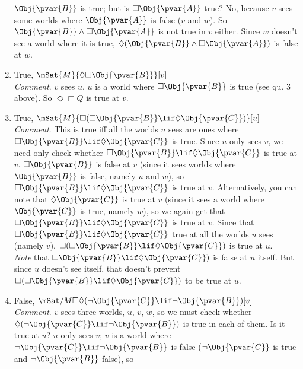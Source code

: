 \documentclass[../../../include/open-logic-section]{subfiles}
\begin{document}
\begin{prob}
\begin{ans}
\begin{enumerate}
        $\Obj{\pvar{B}}$ is true; but is $\Box \Obj{\pvar{A}}$ true? No, because $v$ sees some
        worlds where $\Obj{\pvar{A}}$ is false ($v$ and $w$). So $\Obj{\pvar{B}}\land\Box \Obj{\pvar{A}}$
        is not true in $v$ either. Since $w$ doesn't see a world
        where it is true, $\Diamond(\Obj{\pvar{B}}\land\Box \Obj{\pvar{A}})$ is false
        at $w$.
        \item True, $\mSat{M}{\Diamond\Box \Obj{\pvar{B}}}[v]$\\
        \emph{Comment}. $v$ sees $u$. $u$ is a world where
        $\Box \Obj{\pvar{B}}$ is true (see qu. 3 above). So $\Diamond\Box Q$ is true
        at $v$.
        \item True, $\mSat{M}{\Box(\Box \Obj{\pvar{B}}\lif\Diamond \Obj{\pvar{C}})}[u]$\\
        \emph{Comment}. This is true iff all the worlds $u$ sees are
        ones where $\Box \Obj{\pvar{B}}\lif\Diamond \Obj{\pvar{C}}$ is true. Since $u$
        only sees $v$, we need only check whether $\Box \Obj{\pvar{B}}\lif\Diamond \Obj{\pvar{C}}$
        is true at $v$. $\Box \Obj{\pvar{B}}$ is false at $v$ (since it sees
        worlds where $\Obj{\pvar{B}}$ is false, namely $u$ and $w$), so $\Box \Obj{\pvar{B}}\lif\Diamond \Obj{\pvar{C}}$
        is true at $v$. Alternatively, you can note that $\Diamond \Obj{\pvar{C}}$ is true at $v$
        (since it sees a world where $\Obj{\pvar{C}}$ is true, namely $w$), so 
        we again get that  $\Box \Obj{\pvar{B}}\lif\Diamond \Obj{\pvar{C}}$
        is true at $v$. Since that $\Box \Obj{\pvar{B}}\lif\Diamond \Obj{\pvar{C}}$ true at all
        the worlds $u$ sees (namely $v$), $\Box(\Box \Obj{\pvar{B}}\lif\Diamond \Obj{\pvar{C}})$
        is true at $u$. \\
        \emph{Note} that $\Box \Obj{\pvar{B}}\lif\Diamond \Obj{\pvar{C}})$ is false at $u$ itself.
        But since $u$ doesn't see itself, that doesn't prevent $\Box(\Box \Obj{\pvar{B}}\lif\Diamond \Obj{\pvar{C}})$
        to be true at $u$.
        \item False, $\mSat/{M}{\Box\Diamond(\lnot \Obj{\pvar{C}}\lif\lnot \Obj{\pvar{B}})}[v]$\\
        \emph{Comment}. $v$ sees three worlds, $u$, $v$, $w$,
        so we must check whether $\Diamond(\lnot \Obj{\pvar{C}}\lif\lnot \Obj{\pvar{B}})$
        is true in each of them. Is it true at $u$? $u$ only sees $v$;
        $v$ is a world where $\lnot \Obj{\pvar{C}}\lif\lnot \Obj{\pvar{B}}$ is false 
        ($\lnot \Obj{\pvar{C}}$ is true and $\lnot \Obj{\pvar{B}}$ false), so 

\end{enumerate}
\end{ans}
\end{prob}
\end{document}
